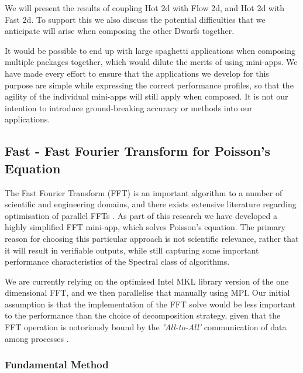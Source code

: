 \documentclass[runningheads,a4paper]{llncs}
\begin{document}
We will present the results of coupling Hot 2d with Flow 2d, and Hot 2d with Fast 2d. To support this we also discuss the potential difficulties that we anticipate will arise when composing the other Dwarfs together. 

It would be possible to end up with large spaghetti applications when composing multiple packages together, which would dilute the merits of using mini-apps. We have made every effort to ensure that the applications we develop for this purpose are simple while expressing the correct performance profiles, so that the agility of the individual mini-apps will still apply when composed. It is not our intention to introduce ground-breaking accuracy or methods into our applications.

\subsection{Fast - Fast Fourier Transform for Poisson's Equation}

\label{sec:fast}

The Fast Fourier Transform (FFT) is an important algorithm to a number of scientific and engineering domains, and there exists extensive literature regarding optimisation of parallel FFTs \cite{}. As part of this research we have developed a highly simplified FFT mini-app, which solves Poisson's equation. The primary reason for choosing this particular approach is not scientific relevance, rather that it will result in verifiable outputs, while still capturing some important performance characteristics of the Spectral class of algorithms.

We are currently relying on the optimised Intel MKL library version of the one dimensional FFT, and we then parallelise that manually using MPI. Our initial assumption is that the implementation of the FFT solve would be less important to the performance than the choice of decomposition strategy, given that the FFT operation is notoriously bound by the \textit{'All-to-All'} communication of data among processes \cite{}.


\subsubsection{Fundamental Method}
\end{document}

